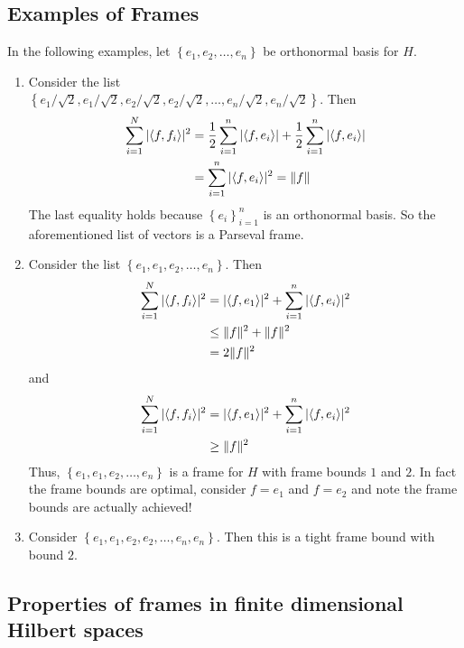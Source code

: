 \subsection{Examples of Frames}
In the following examples, let $\left\{ e_1 , e_2 , \ldots , e_n \right\}$ be orthonormal basis for $H$.
\begin{enumerate}
    \item Consider the list \\
	$\left\{ e_1 / \sqrt{2} , e_1 / \sqrt{2} , e_2 / \sqrt{2} , e_2 / \sqrt{2}, \ldots , e_n / \sqrt{2} , e_n / \sqrt{2} \right\}$. Then
	\begin{align*}
	    \sum_{i=1}^{N} |\langle f, f_i \rangle|^2 &= \frac{1}{2} \sum_{i=1}^{n} |\langle f, e_i \rangle|
	+ \frac{1}{2} \sum_{i=1}^{n} |\langle f, e_i \rangle| \\
	&= \sum_{i=1}^{n} |\langle f, e_i \rangle|^2 = \lVert f \rVert
    \end{align*}
    The last equality holds because $\left\{ e_i \right\}_{i=1}^{n} $ is an orthonormal basis. So the aforementioned list of vectors is a Parseval frame.
    
\item Consider the list $\left\{ e_1, e_1, e_2 , \ldots, e_n \right\}$. Then
    \begin{align*}
	\sum_{i=1}^{N} |\langle f, f_i \rangle|^2 &= |\langle f, e_1 \rangle|^2 + \sum_{i=1}^{n} |\langle f, e_i \rangle|^2 \\
	&\le \lVert f \rVert^2 + \lVert f \rVert^2 \\
	&= 2\lVert f \rVert^2
    \end{align*}
    and 
\begin{align*}
	\sum_{i=1}^{N} |\langle f, f_i \rangle|^2 &= |\langle f, e_1 \rangle|^2 + \sum_{i=1}^{n} |\langle f, e_i \rangle|^2 \\
	&\ge \lVert f \rVert^2
    \end{align*}
    Thus, $\left\{ e_1, e_1 , e_2 , \ldots , e_n \right\}$ is a frame for $H$ with frame bounds $1$ and $2$. In fact the frame bounds are optimal, consider $f=e_1$ and $f=e_2$ and note the frame bounds are actually achieved!

\item Consider $\left\{ e_1, e_1 , e_2, e_2 , \ldots , e_n , e_n \right\}$. Then this is a tight frame bound with bound $2$.
\end{enumerate}

\subsection{Properties of frames in finite dimensional Hilbert spaces}

